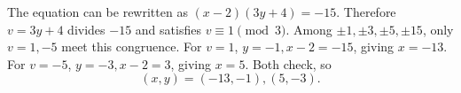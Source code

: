 The equation can be rewritten as $(x-2)(3y+4)=-15$. Therefore $v=3y+4$ divides $-15$ and satisfies $v\equiv1\pmod3$. Among $\pm1,\pm3,\pm5,\pm15$, only $v=1,-5$ meet this congruence. For $v=1$, $y=-1,x-2=-15$, giving $x=-13$. For $v=-5$, $y=-3,x-2=3$, giving $x=5$. Both check, so
\[\boxed{(x,y)=(-13,-1),(5,-3)}.\]
